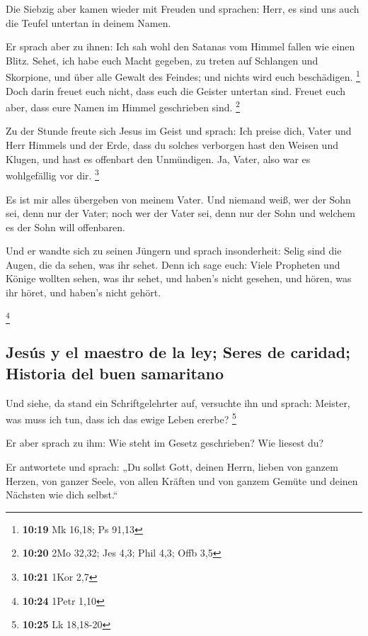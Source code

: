  Die Siebzig aber kamen wieder mit Freuden und sprachen:
Herr, es sind uns auch die Teufel untertan in deinem Namen.

 Er sprach aber zu ihnen: Ich sah wohl den Satanas vom
Himmel fallen wie einen Blitz.  Sehet, ich habe euch
Macht gegeben, zu treten auf Schlangen und Skorpione, und über alle
Gewalt des Feindes; und nichts wird euch beschädigen. \footnote{\textbf{10:19}
  Mk 16,18; Ps 91,13}  Doch darin freuet euch nicht, dass
euch die Geister untertan sind. Freuet euch aber, dass eure Namen im
Himmel geschrieben sind. \footnote{\textbf{10:20} 2Mo 32,32; Jes 4,3;
  Phil 4,3; Offb 3,5}

 Zu der Stunde freute sich Jesus im Geist und sprach: Ich
preise dich, Vater und Herr Himmels und der Erde, dass du solches
verborgen hast den Weisen und Klugen, und hast es offenbart den
Unmündigen. Ja, Vater, also war es wohlgefällig vor dir. \footnote{\textbf{10:21}
  1Kor 2,7}

 Es ist mir alles übergeben von meinem Vater. Und niemand
weiß, wer der Sohn sei, denn nur der Vater; noch wer der Vater sei, denn
nur der Sohn und welchem es der Sohn will offenbaren.

 Und er wandte sich zu seinen Jüngern und sprach
insonderheit: Selig sind die Augen, die da sehen, was ihr sehet.
 Denn ich sage euch: Viele Propheten und Könige wollten
sehen, was ihr sehet, und haben's nicht gesehen, und hören, was ihr
höret, und haben's nicht gehört.

\footnote{\textbf{10:24} 1Petr 1,10}

\hypertarget{jesuxfas-y-el-maestro-de-la-ley-seres-de-caridad-historia-del-buen-samaritano}{%
\subsection{Jesús y el maestro de la ley; Seres de caridad; Historia del
buen
samaritano}\label{jesuxfas-y-el-maestro-de-la-ley-seres-de-caridad-historia-del-buen-samaritano}}

 Und siehe, da stand ein Schriftgelehrter auf, versuchte
ihn und sprach: Meister, was muss ich tun, dass ich das ewige Leben
ererbe? \footnote{\textbf{10:25} Lk 18,18-20}

 Er aber sprach zu ihm: Wie steht im Gesetz geschrieben?
Wie liesest du?

 Er antwortete und sprach: „Du sollst Gott, deinen Herrn,
lieben von ganzem Herzen, von ganzer Seele, von allen Kräften und von
ganzem Gemüte und deinen Nächsten wie dich selbst.``

